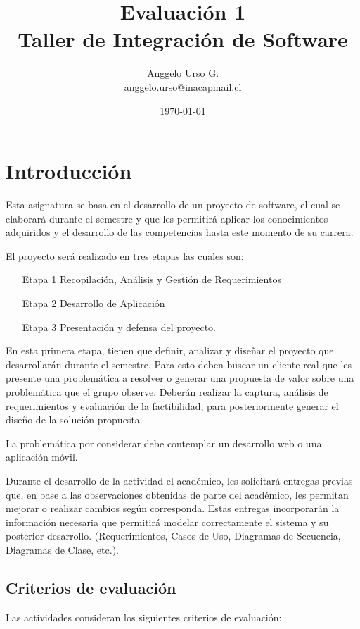 \documentclass[]{article}
\title{Evaluación 1 \protect\\ Taller de Integración de Software}
\author{Anggelo Urso G. \\ anggelo.urso@inacapmail.cl}
\date{\today}
\begin{document}
\thispagestyle{empty}
\maketitle

\section{Introducción}
Esta asignatura se basa en el desarrollo de un proyecto de software, el cual se  elaborará durante el semestre y que les permitirá aplicar los conocimientos 
adquiridos y el desarrollo de las competencias hasta este momento de su carrera.

El proyecto será realizado en tres etapas las cuales son:\\

\begin{enumerate}
    \item[Etapa 1] Recopilación, Análisis y Gestión de Requerimientos
    \item[Etapa 2] Desarrollo de Aplicación
    \item[Etapa 3] Presentación y defensa del proyecto.
\end{enumerate} 

En esta primera etapa, tienen que definir, analizar y diseñar el proyecto que desarrollarán durante el semestre. Para esto deben buscar un cliente real 
que les presente una problemática a resolver o generar una propuesta de valor sobre una problemática que el grupo observe. Deberán realizar la captura, 
análisis de requerimientos y evaluación de la factibilidad, para posteriormente generar el diseño de la solución propuesta.

La problemática por considerar debe contemplar un desarrollo web o una aplicación móvil.

Durante el desarrollo de la actividad el académico, les solicitará entregas previas que, en base a las observaciones obtenidas de parte del académico, les 
permitan mejorar o realizar cambios según corresponda. Estas entregas incorporarán la información necesaria que permitirá modelar correctamente el sistema 
y su posterior desarrollo. (Requerimientos, Casos de Uso, Diagramas de Secuencia, Diagramas de Clase, etc.).

\subsection{Criterios de evaluación}

Las actividades consideran los siguientes criterios de evaluación:
\end{document}
